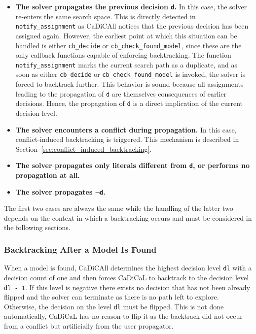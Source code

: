 \documentclass[12pt,a4paper]{article}
\begin{document}
\begin{itemize}

\item \textbf{The solver propagates the previous decision \texttt{d}.} In this case, the solver re-enters the same search space. This is directly detected in \verb|notify_assignment| as CaDiCAll notices that the previous decision has been assigned again. However, the earliest point at which this situation can be handled is either \verb|cb_decide| or \verb|cb_check_found_model|, since these are the only callback functions capable of enforcing backtracking. The function \verb|notify_assignment| marks the current search path as a duplicate, and as soon as either \verb|cb_decide| or \verb|cb_check_found_model| is invoked, the solver is forced to backtrack further. This behavior is sound because all assignments leading to the propagation of \verb|d| are themselves consequences of earlier decisions. Hence, the propagation of \verb|d| is a direct implication of the current decision level.

\item \textbf{The solver encounters a conflict during propagation.} In this case, conflict-induced backtracking is triggered. This mechanism is described in Section~\ref{sec:conflict_induced_backtracking}.

\item \textbf{The solver propagates only literals different from \texttt{d}, or performs no propagation at all.}

\item \textbf{The solver propagates \texttt{$\lnot$d}.}

\end{itemize}

The first two cases are always the same while the handling of the latter two depends on the context in which a backtracking occurs and must be considered in the following sections.

\subsubsection{Backtracking After a Model Is Found}

When a model is found, CaDiCAll determines the highest decision level \verb|dl| with a decision count of one and then forces CaDiCaL to backtrack to the decision level \verb|dl - 1|. If this level is negative there exists no decision that has not been already flipped and the solver can terminate as there is no path left to explore. Otherwise, the decision on the level \verb|dl| must be flipped. This is not done automatically, CaDiCaL has no reason to flip it as the backtrack did not occur from a conflict but artificially from the user propagator.
\end{document}
